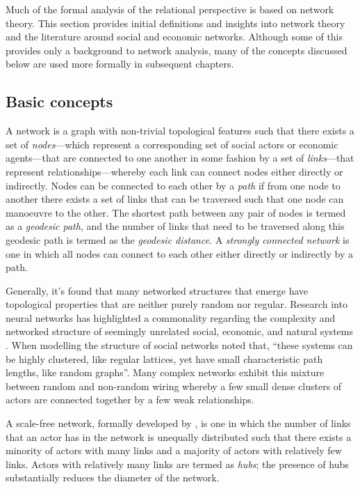 Much of the formal analysis of the relational perspective is based on network theory. This section provides initial definitions and insights into network theory and the literature around social and economic networks. Although some of this provides only a background to network analysis, many of the concepts discussed below are used more formally in subsequent chapters.

\subsection{Basic concepts}

A network is a graph with non-trivial topological features such that there exists a set of \emph{nodes}---which represent a corresponding set of social actors or economic agents---that are connected to one another in some fashion by a set of \emph{links}---that represent relationships---whereby each link can connect nodes either directly or indirectly. Nodes can be connected to each other by a \emph{path} if from one node to another there exists a set of links that can be traversed such that one node can manoeuvre to the other. The shortest path between any pair of nodes is termed as a \emph{geodesic path}, and the number of links that need to be traversed along this geodesic path is termed as the \emph{geodesic distance}. A \emph{strongly connected network} is one in which all nodes can connect to each other either directly or indirectly by a path.

Generally, it's found that many networked structures that emerge have topological properties that are neither purely random nor regular. Research into neural networks has highlighted a commonality regarding the complexity and networked structure of seemingly unrelated social, economic, and natural systems \citep{SpornsTononi2005, Sporns2010}. When modelling the structure of social networks \citet[p.~440]{WattsStrogatz1998} noted that, ``these systems can be highly clustered, like regular lattices, yet have small characteristic path lengths, like random graphs''. Many complex networks exhibit this mixture between random and non-random wiring whereby a few small dense clusters of actors are connected together by a few weak relationships.

A scale-free network, formally developed by \citet{BarabasiAlbert1999}, is one in which the number of links that an actor has in the network is unequally distributed such that there exists a minority of actors with many links and a majority of actors with relatively few links. Actors with relatively many links are termed as \emph{hubs}; the presence of hubs substantially reduces the diameter of the network.

